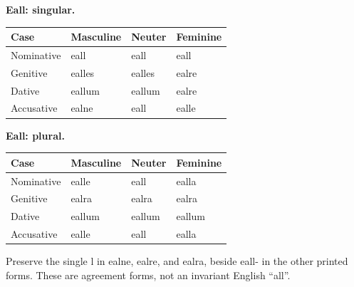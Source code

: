 \textbf{Eall: singular.}

\par\begingroup
\fontsize{10.5}{13.2}\selectfont
\setlength{\LTleft}{0pt}\setlength{\LTright}{\fill}
\noindent
\begin{tabular}{@{}>{\raggedright\arraybackslash}p{22.0mm}>{\raggedright\arraybackslash}p{31.188mm}>{\raggedright\arraybackslash}p{31.188mm}>{\raggedright\arraybackslash}p{31.188mm}@{}}
\toprule
\textbf{Case} & \textbf{Masculine} & \textbf{Neuter} & \textbf{Feminine} \\
\midrule
Nominative & eall & eall & eall \\
Genitive & ealles & ealles & ealre \\
Dative & eallum & eallum & ealre \\
Accusative & ealne & eall & ealle \\
\bottomrule
\end{tabular}
\par\endgroup
\textbf{Eall: plural.}

\par\begingroup
\fontsize{10.5}{13.2}\selectfont
\setlength{\LTleft}{0pt}\setlength{\LTright}{\fill}
\noindent
\begin{tabular}{@{}>{\raggedright\arraybackslash}p{22.0mm}>{\raggedright\arraybackslash}p{31.188mm}>{\raggedright\arraybackslash}p{31.188mm}>{\raggedright\arraybackslash}p{31.188mm}@{}}
\toprule
\textbf{Case} & \textbf{Masculine} & \textbf{Neuter} & \textbf{Feminine} \\
\midrule
Nominative & ealle & eall & ealla \\
Genitive & ealra & ealra & ealra \\
Dative & eallum & eallum & eallum \\
Accusative & ealle & eall & ealla \\
\bottomrule
\end{tabular}
\par\endgroup
Preserve the single l in ealne, ealre, and ealra, beside eall- in the other printed forms. These are agreement forms, not an invariant English “all”.

